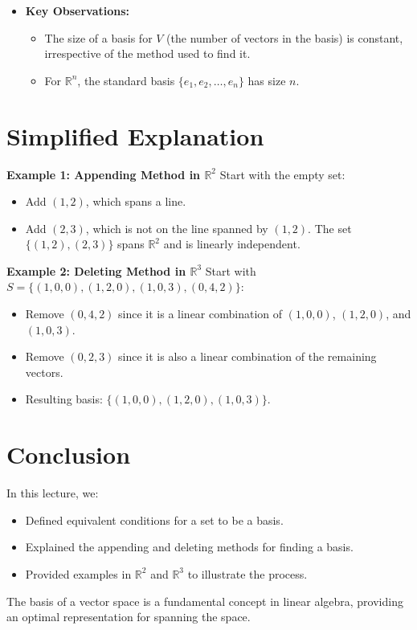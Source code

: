 \documentclass{article}
\begin{document}
\begin{itemize}
  \item \textbf{Key Observations:}
    \begin{itemize}
      \item The size of a basis for $V$ (the number of vectors in the basis) is constant, irrespective of the method used to find it.
      \item For $\mathbb{R}^n$, the standard basis $\{e_1, e_2, \dots, e_n\}$ has size $n$.
    \end{itemize}
\end{itemize}

\section*{Simplified Explanation}

\textbf{Example 1: Appending Method in $\mathbb{R}^2$}
Start with the empty set:
\begin{itemize}
  \item Add $(1, 2)$, which spans a line.
  \item Add $(2, 3)$, which is not on the line spanned by $(1, 2)$. The set $\{(1, 2), (2, 3)\}$ spans $\mathbb{R}^2$ and is linearly independent.
\end{itemize}

\textbf{Example 2: Deleting Method in $\mathbb{R}^3$}
Start with $S = \{(1, 0, 0), (1, 2, 0), (1, 0, 3), (0, 4, 2)\}$:
\begin{itemize}
  \item Remove $(0, 4, 2)$ since it is a linear combination of $(1, 0, 0)$, $(1, 2, 0)$, and $(1, 0, 3)$.
  \item Remove $(0, 2, 3)$ since it is also a linear combination of the remaining vectors.
  \item Resulting basis: $\{(1, 0, 0), (1, 2, 0), (1, 0, 3)\}$.
\end{itemize}

\section*{Conclusion}

In this lecture, we:
\begin{itemize}
  \item Defined equivalent conditions for a set to be a basis.
  \item Explained the appending and deleting methods for finding a basis.
  \item Provided examples in $\mathbb{R}^2$ and $\mathbb{R}^3$ to illustrate the process.
\end{itemize}

The basis of a vector space is a fundamental concept in linear algebra, providing an optimal representation for spanning the space.
\end{document}
